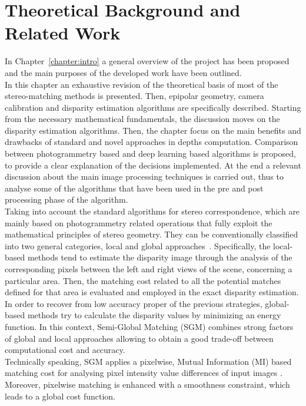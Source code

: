 \chapter{Theoretical Background and Related Work}
\label{chapter:background} 

In Chapter~\ref{chapter:intro} a general overview of the project has been proposed and the main purposes of the developed work have been outlined.\\
In this chapter an exhaustive revision of the theoretical basis of most of the stereo-matching methods is presented. 
Then, epipolar geometry, camera calibration and disparity estimation algorithms are specifically described. 
Starting from the necessary mathematical fundamentals, the discussion moves on the disparity estimation algorithms. 
Then, the chapter focus on the main benefits and drawbacks of standard and novel approaches in depths computation.
Comparison between photogrammetry based and deep learning based algorithms is proposed, to provide a clear explanation of the decisions implemented.
At the end a relevant discussion about the main image processing techniques is carried out, thus to analyse some of the algorithms that have been used in the pre and post processing phase of the algorithm. \\
Taking into account the standard algorithms for stereo correspondence, which are mainly based on photogrammetry related operations that fully exploit the mathematical principles of stereo geometry.
They can be conventionally classified into two general categories, local and global approaches~\cite{Scharstein2001}.
Specifically, the local-based methods tend to estimate the disparity image through the analysis of the corresponding pixels between the left and right views of the scene, concerning a particular area. 
Then, the matching cost related to all the potential matches defined for that area is evaluated and employed in the exact disparity estimation.
In order to recover from low accuracy proper of the previous strategies, global-based methods try to calculate the disparity values by minimizing an energy function.
In this context, Semi-Global Matching (SGM) combines strong factors of global and local approaches allowing to obtain a good trade-off between computational cost and accuracy. \\
Technically speaking, SGM applies a pixelwise, Mutual Information (MI) based matching cost for analysing pixel intensity value differences of input images \cite{Hirschmuller2008}.
Moreover, pixelwise matching is enhanced with a smoothness constraint, which leads to a global cost function. 
